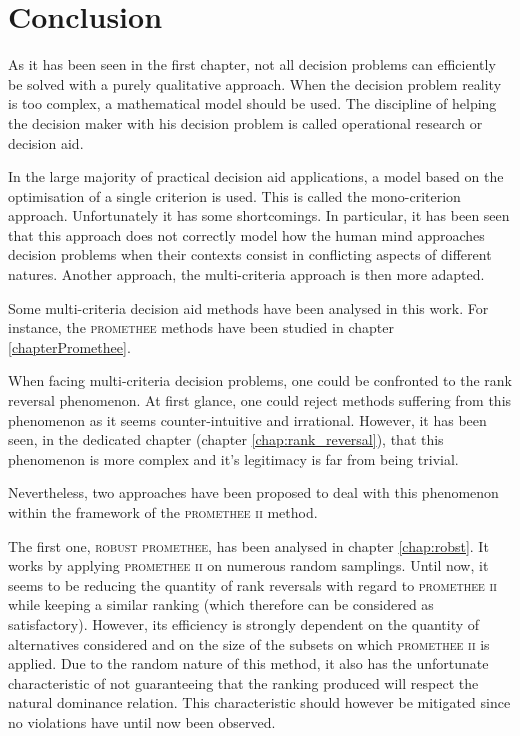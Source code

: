\chapter{Conclusion}

As it has been seen in the first chapter, not all decision problems can efficiently be solved with a purely qualitative approach. 
When the decision problem reality is too complex, a mathematical model should be used.
The discipline of helping the decision maker with his decision problem is called operational research or decision aid.

In the large majority of practical decision aid applications, a model based on the optimisation of a single criterion is used. 
This is called the mono-criterion approach.
Unfortunately it has some shortcomings.
In particular, it has been seen that this approach does not correctly model how the human mind approaches decision problems when their contexts consist in conflicting aspects of different natures.
Another approach, the multi-criteria approach is then more adapted.

Some multi-criteria decision aid methods have been analysed in this work.
For instance, the \textsc{promethee} methods have been studied in chapter \ref{chapterPromethee}.

When facing multi-criteria decision problems, one could be confronted to the rank reversal phenomenon. 
At first glance, one could reject methods suffering from this phenomenon as it seems counter-intuitive and irrational.
However, it has been seen, in the dedicated chapter (chapter \ref{chap:rank_reversal}), that this phenomenon is more complex and it's legitimacy is far from being trivial.

Nevertheless, two approaches have been proposed to deal with this phenomenon within the framework of the \textsc{promethee ii} method.

The first one, \textsc{robust promethee}, has been analysed in chapter \ref{chap:robst}.
It works by applying \textsc{promethee ii} on numerous random samplings.
Until now, it seems to be reducing the quantity of rank reversals with regard to \textsc{promethee ii} while keeping a similar ranking (which therefore can be considered as satisfactory). 
However, its efficiency is strongly dependent on the quantity of alternatives considered and on the size of the subsets on which \textsc{promethee ii} is applied.
Due to the random nature of this method, it also has the unfortunate characteristic of not guaranteeing that the ranking produced will respect the natural dominance relation. This characteristic should however be mitigated since no violations have until now been observed.

